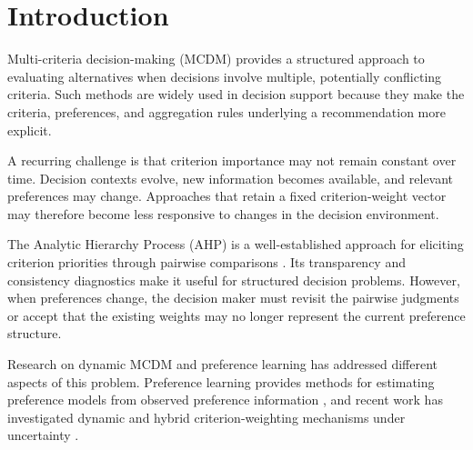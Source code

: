 \documentclass[12pt,a4paper]{article}
\begin{document}
\begin{abstract}
\medskip\noindent\textbf{Originality/value.} The study reframes the comparison between feedback-driven weighting and AHP as a question of the conditions under which each information source is advantageous. It provides a regime map and separates adaptive weighting from risk aggregation. The factorial analysis is exploratory, the preference-gap magnitudes are not empirically calibrated, and the real-data application does not support a claim of predictive usefulness for PSDF as specified.

\medskip\noindent\textbf{Keywords:} Adaptive multi-criteria decision-making; decision support systems; feedback-driven weighting; Analytic Hierarchy Process; preference learning; sensitivity analysis.
\end{abstract}

\section{Introduction}
Multi-criteria decision-making (MCDM) provides a structured approach to evaluating alternatives when decisions involve multiple, potentially conflicting criteria. Such methods are widely used in decision support because they make the criteria, preferences, and aggregation rules underlying a recommendation more explicit.

A recurring challenge is that criterion importance may not remain constant over time. Decision contexts evolve, new information becomes available, and relevant preferences may change. Approaches that retain a fixed criterion-weight vector may therefore become less responsive to changes in the decision environment.

The Analytic Hierarchy Process (AHP) is a well-established approach for eliciting criterion priorities through pairwise comparisons \citep{saaty1980}. Its transparency and consistency diagnostics make it useful for structured decision problems. However, when preferences change, the decision maker must revisit the pairwise judgments or accept that the existing weights may no longer represent the current preference structure.

Research on dynamic MCDM and preference learning has addressed different aspects of this problem. Preference learning provides methods for estimating preference models from observed preference information \citep{bengs2021,hullermeier2024a,hullermeier2024b}, and recent work has investigated dynamic and hybrid criterion-weighting mechanisms under uncertainty \citep{ayan2023,lu2026,yang2025}.
\end{document}

